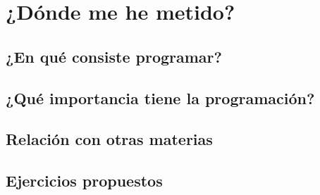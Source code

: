 
\chapter{¿Dónde me he metido?}

\section{¿En qué consiste programar?}

\section{¿Qué importancia tiene la programación?}

\section{Relación con otras materias}

\section{Ejercicios propuestos}

